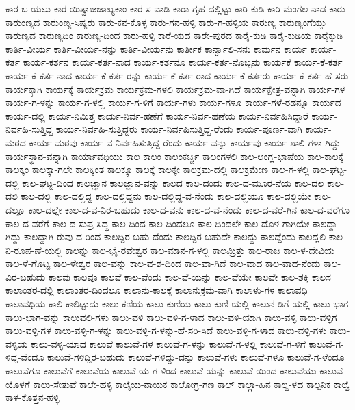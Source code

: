 ಕಾರ-ಬ-ಯಲು
ಕಾರ-ಯಿತ್ವಾಜಜಾಖ್ಯಕಾಂ
ಕಾರ-ಸ-ವಾಡಿ
ಕಾರಾ-ಗೃಹ-ದಲ್ಲಿಟ್ಟು
ಕಾರಿ-ಕುಡಿ
ಕಾರಿ-ಮಂಗಲ-ನಾಡ
ಕಾರು
ಕಾರುಂಣ್ಯದ
ಕಾರುಂಣ್ಯ-ಸಿಷ್ಯರು
ಕಾರು-ಕನ-ಕೊಳ್ಳ
ಕಾರು-ಗನ-ಹಳ್ಳಿ
ಕಾರು-ಗ-ಹಳ್ಳಿಯ
ಕಾರುಣ್ಯ
ಕಾರುಣ್ಯಂಗೆಯ್ದು
ಕಾರುಣ್ಯದ
ಕಾರುಣ್ಯದಿಂ
ಕಾರುಣ್ಯ-ದಿಂದ
ಕಾರು-ಹಳ್ಳಿ
ಕಾರೆ-ಯದ
ಕಾರೇ-ಪುರದ
ಕಾರೈ-ಕುಡಿ
ಕಾರೈ-ಕುಡಿಯ
ಕಾರೈಕ್ಕುಡಿ
ಕಾರ್ತಿ-ವೀರ್ಯ
ಕಾರ್ತಿ-ವೀರ್ಯ-ನನ್ನು
ಕಾರ್ತಿ-ವೀರ್ಯನು
ಕಾರ್ತೀಕ
ಕಾರ್ನ್ವಾಲಿ-ಸನು
ಕಾರ್ಮನ
ಕಾರ್ಯ
ಕಾರ್ಯ-ಕರ್ತ
ಕಾರ್ಯ-ಕರ್ತನ
ಕಾರ್ಯ-ಕರ್ತ-ನಾದ
ಕಾರ್ಯ-ಕರ್ತನೂ
ಕಾರ್ಯ-ಕರ್ತ-ನೊಬ್ಬನು
ಕಾರ್ಯಕೆ
ಕಾರ್ಯ-ಕೆ-ಕರ್ತ
ಕಾರ್ಯ-ಕೆ-ಕರ್ತ-ನಾದ
ಕಾರ್ಯ-ಕೆ-ಕರ್ತ-ರನ್ನು
ಕಾರ್ಯ-ಕೆ-ಕರ್ತ-ರಾದ
ಕಾರ್ಯ-ಕೆ-ಕರ್ತರು
ಕಾರ್ಯ-ಕೆ-ಕರ್ತ-ಹೆ-ಸರು
ಕಾರ್ಯಕ್ಕಾಗಿ
ಕಾರ್ಯಕ್ಕೆ
ಕಾರ್ಯಕ್ರಮ
ಕಾರ್ಯಕ್ರಮ-ಗಳಲಿ
ಕಾರ್ಯಕ್ರಮ-ವಾ-ಗಿದೆ
ಕಾರ್ಯಕ್ಷೇತ್ರ-ವನ್ನಾಗಿ
ಕಾರ್ಯ-ಗಳ
ಕಾರ್ಯ-ಗ-ಳನ್ನು
ಕಾರ್ಯ-ಗ-ಳಲ್ಲಿ
ಕಾರ್ಯ-ಗ-ಳಿಗೆ
ಕಾರ್ಯ-ಗಳು
ಕಾರ್ಯ-ಗಳೂ
ಕಾರ್ಯ-ಗಳೆ-ರಡನ್ನೂ
ಕಾರ್ಯದ
ಕಾರ್ಯ-ದಲ್ಲಿ
ಕಾರ್ಯ-ನಿಮಿತ್ತ
ಕಾರ್ಯ-ನಿರ್ವ-ಹಣೆಗೆ
ಕಾರ್ಯ-ನಿರ್ವ-ಹಣೆಯ
ಕಾರ್ಯ-ನಿರ್ವಹಿಸಿದ್ದಾರೆ
ಕಾರ್ಯ-ನಿರ್ವಹಿ-ಸುತ್ತಿದ್ದ
ಕಾರ್ಯ-ನಿರ್ವಹಿ-ಸುತ್ತಿದ್ದರು
ಕಾರ್ಯ-ನಿರ್ವಹಿಸುತ್ತಿದ್ದ-ರೆಂದು
ಕಾರ್ಯ-ಪೂರ್ಣ-ವಾಗಿ
ಕಾರ್ಯ-ಮಠದ
ಕಾರ್ಯ-ಮಠವು
ಕಾರ್ಯ-ವ-ನಿರ್ವಹಿಸುತ್ತಿದ್ದ-ರೆಂದು
ಕಾರ್ಯ-ವನ್ನು
ಕಾರ್ಯವು
ಕಾರ್ಯ-ಶಾಲಿ-ಗಳಾ-ಗಿದ್ದು
ಕಾರ್ಯಸ್ಥಾನ-ವನ್ನಾಗಿ
ಕಾರ್ಯಾವಧಿಯು
ಕಾಲ
ಕಾಲಂ
ಕಾಲಂಕರ್ಚ್ಚಿ
ಕಾಲಂಗಳಲಿ
ಕಾಲ-ಆಂಗ್ಲ-ಭಾಷೆಯ
ಕಾಲ-ಕಾಲಕ್ಕೆ
ಕಾಲಕ್ಕಂ
ಕಾಲಕ್ಕಾ-ಗಲೇ
ಕಾಲಕ್ಕಿಂತ
ಕಾಲಕ್ಕೂ
ಕಾಲಕ್ಕೆ
ಕಾಲಕ್ಕೇ
ಕಾಲಕ್ರಮ-ದಲ್ಲಿ
ಕಾಲಕ್ರಮೇಣ
ಕಾಲ-ಗ-ಳಲ್ಲಿ
ಕಾಲ-ಘಟ್ಟ-ದಲ್ಲಿ
ಕಾಲ-ಘಟ್ಟ-ದಿಂದ
ಕಾಲಜ್ಞಾನ
ಕಾಲಜ್ಞಾನ-ವನ್ನು
ಕಾಲದ
ಕಾಲ-ದಂದು
ಕಾಲ-ದ-ಮೂರ-ನೆಯ
ಕಾಲ-ದಲ
ಕಾಲ-ದಲಿ
ಕಾಲ-ದಲ್ಲಿ
ಕಾಲ-ದಲ್ಲಿದ್ದ
ಕಾಲ-ದಲ್ಲಿದ್ದನು
ಕಾಲ-ದಲ್ಲಿದ್ದ-ವ-ನೆಂದು
ಕಾಲ-ದಲ್ಲಿಯೂ
ಕಾಲ-ದಲ್ಲಿಯೇ
ಕಾಲ-ದಲ್ಲೂ
ಕಾಲ-ದಲ್ಲೇ
ಕಾಲ-ದ-ವ-ನಿರ-ಬಹುದು
ಕಾಲ-ದ-ವನು
ಕಾಲ-ದ-ವ-ನೆಂದು
ಕಾಲ-ದ-ವರೆ-ಗಿನ
ಕಾಲ-ದ-ವರೆಗೂ
ಕಾಲ-ದ-ವರೆಗೆ
ಕಾಲ-ದ-ಸುಪ್ರ-ಸಿದ್ಧ
ಕಾಲ-ದಿಂದ
ಕಾಲ-ದಿಂದಲೂ
ಕಾಲ-ದಿಂದಲೇ
ಕಾಲ-ದೊಳ-ಗಾಗಿಯೇ
ಕಾಲದ್ದಾ-ಗಿದ್ದು
ಕಾಲದ್ದಾಗಿ-ರುವು-ದ-ರಿಂದ
ಕಾಲದ್ದಿರ-ಬಹು-ದೆಂದು
ಕಾಲದ್ದಿರ-ಬಹುದೇ
ಕಾಲದ್ದು
ಕಾಲದ್ದೆಂದು
ಕಾಲದ್ಲಲಿ
ಕಾಲ-ನಿ-ರೂಪ-ಣೆ-ಯಲ್ಲಿ
ಕಾಲನ್ನು
ಕಾಲ-ಭೈ-ರವೇಶ್ವರ
ಕಾಲ-ಮಾನ-ಗ-ಳಲ್ಲಿ
ಕಾಲಮ್ರಿತ್ತು
ಕಾಲ-ರಾಜ
ಕಾಲ-ಳ-ದೇವಿಯ
ಕಾಲ-ಳೆ-ಗೊಟ್ಟ
ಕಾಲ-ಳೇಶ್ವರ
ಕಾಲ-ವನ್ನು
ಕಾಲ-ವ-ಶ-ದಿಂದ
ಕಾಲ-ವಾ-ಗಿದೆ
ಕಾಲ-ವಾದ
ಕಾಲ-ವಾದ-ನೆಂದು
ಕಾಲ-ವಿರ-ಬಹುದು
ಕಾಲವು
ಕಾಲವೂ
ಕಾಲವೆ
ಕಾಲ-ವೆಂದು
ಕಾಲ-ವೆ-ಯನ್ನು
ಕಾಲ-ವೆಯೇ
ಕಾಲವೇ
ಕಾಲ-ಶಕ್ತಿ
ಕಾಲಸ
ಕಾಲಾಂತರ-ದಲ್ಲಿ
ಕಾಲಾಂತರ-ದಿಂದಲೂ
ಕಾಲಾನು-ಕಾಲಕ್ಕೆ
ಕಾಲಾನುಕ್ರಮ-ವಾಗಿ
ಕಾಲಾಳು-ಗಳ
ಕಾಲಾವಧಿ
ಕಾಲಾವಧಿಯ
ಕಾಲಿ
ಕಾಲಿಟ್ಟುದು
ಕಾಲು-ಕಣಿಯ
ಕಾಲು-ಕುಣಿಯ
ಕಾಲು-ಕುಣಿ-ಯಲ್ಲಿ
ಕಾಲುನ-ಡಿಗೆ-ಯಲ್ಲಿ
ಕಾಲು-ಭಾಗ
ಕಾಲು-ಭಾಗ-ವನ್ನು
ಕಾಲುವಲಿ-ಗಳು
ಕಾಲು-ವಳಿ
ಕಾಲು-ವಳಿ-ಗ-ಳಾದ
ಕಾಲು-ವಳಿ-ಯಾಗಿ
ಕಾಲು-ವಳ್ಳಿ
ಕಾಲು-ವಳ್ಳಿಗ
ಕಾಲು-ವಳ್ಳಿ-ಗಳ
ಕಾಲು-ವಳ್ಳಿ-ಗ-ಳನ್ನು
ಕಾಲು-ವಳ್ಳಿ-ಗ-ಳನ್ನು-ಹೆ-ಸರಿ-ಸಿದೆ
ಕಾಲು-ವಳ್ಳಿ-ಗ-ಳಾದ
ಕಾಲು-ವಳ್ಳಿ-ಗಳು
ಕಾಲು-ವಳ್ಳಿಯ
ಕಾಲು-ವಳ್ಳಿ-ಯಾದ
ಕಾಲುವೆ
ಕಾಲುವೆ-ಗಳ
ಕಾಲುವೆ-ಗ-ಳನ್ನು
ಕಾಲುವೆ-ಗ-ಳಲ್ಲಿ
ಕಾಲುವೆ-ಗ-ಳಿಗೆ
ಕಾಲುವೆ-ಗ-ಳಿದ್ದ-ವೆಂದೂ
ಕಾಲುವೆ-ಗಳಿದ್ದಿರ-ಬಹುದು
ಕಾಲುವೆ-ಗಳಿದ್ದು-ದನ್ನು
ಕಾಲುವೆ-ಗಳು
ಕಾಲುವೆ-ಗಳೂ
ಕಾಲುವೆ-ಗ-ಳೆಂದೂ
ಕಾಲುವೆಗೂ
ಕಾಲುವೆಗೆ
ಕಾಲುವೆಯ
ಕಾಲುವೆ-ಯ-ಗ-ಳಿಂದ
ಕಾಲುವೆ-ಯನ್ನು
ಕಾಲುವೆ-ಯಿಂದ
ಕಾಲುವೆಯು
ಕಾಲುವೆ-ಯೊಳಗೆ
ಕಾಲು-ಸೇತುವೆ
ಕಾಲೇ-ಹಳ್ಳಿ
ಕಾಲೈಯ-ನಾಯಕ
ಕಾಲೋಗ್ರ-ಗಣ
ಕಾಲ್
ಕಾಲ್ಗಾ-ಹಿನ
ಕಾಲ್ದ-ಳದ
ಕಾಲ್ಪನಿಕ
ಕಾಲ್ವೆ
ಕಾಳ-ಕೊತ್ತನ-ಹಳ್ಳಿ
